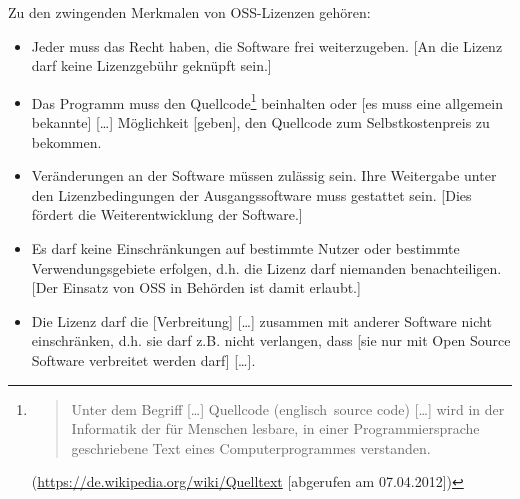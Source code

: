 \documentclass[a4paper]{scrartcl}
\begin{document}
Zu den zwingenden Merkmalen von OSS-Lizenzen gehören:

\begin{itemize}
\item Jeder muss das Recht haben, die Software frei weiterzugeben. [An die
  Lizenz darf keine Lizenzgebühr geknüpft sein.]

\item Das Programm muss den Quellcode\footnote{\begin{quote}Unter dem Begriff [\ldots]
      Quellcode (englisch~source code) [\ldots] wird in der Informatik der für
      Menschen lesbare, in einer Programmiersprache geschriebene Text eines
      Computerprogrammes verstanden.\end{quote}
    (\url{https://de.wikipedia.org/wiki/Quelltext} [abgerufen am 07.04.2012])}
  beinhalten oder [es muss eine allgemein bekannte] [\ldots] Möglichkeit
  [geben], den Quellcode zum Selbstkostenpreis zu bekommen.

\item Veränderungen an der Software müssen zulässig sein. Ihre Weitergabe unter
  den Lizenzbedingungen der Ausgangssoftware muss gestattet sein. [Dies fördert
  die Weiterentwicklung der Software.]

\item Es darf keine Einschränkungen auf bestimmte Nutzer oder bestimmte
  Verwendungsgebiete erfolgen, d.h. die Lizenz darf niemanden
  benachteiligen. [Der Einsatz von OSS in Behörden ist damit erlaubt.]

\item Die Lizenz darf die [Verbreitung] [{\dots}] zusammen mit anderer Software
  nicht einschränken, d.h. sie darf z.B. nicht verlangen, dass [sie nur mit Open
  Source Software verbreitet werden darf] [\ldots].


\end{itemize}
\end{document}
